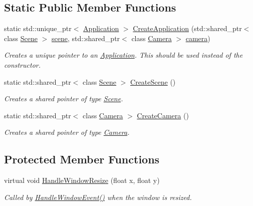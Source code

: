 \subsection*{Static Public Member Functions}
\begin{DoxyCompactItemize}
\item
static std\+::unique\+\_\+ptr$<$ \hyperlink{class_application}{Application} $>$ \hyperlink{class_application_a727f63f898a68bddf6d88309195ef194}{Create\+Application} (std\+::shared\+\_\+ptr$<$ class \hyperlink{class_scene}{Scene} $>$ \hyperlink{class_application_a88c6615107a5094bb93fa5f153f79554}{scene}, std\+::shared\+\_\+ptr$<$ class \hyperlink{class_camera}{Camera} $>$ \hyperlink{class_application_a0e8589fcb13c520ba472473abe5a518d}{camera})
\begin{DoxyCompactList}\small\item\em Creates a unique pointer to an \hyperlink{class_application}{Application}. This should be used instead of the constructor. \end{DoxyCompactList}\item
static std\+::shared\+\_\+ptr$<$ class \hyperlink{class_scene}{Scene} $>$ \hyperlink{class_application_a511e638cf5748e10151f17d6140b9119}{Create\+Scene} ()
\begin{DoxyCompactList}\small\item\em Creates a shared pointer of type \hyperlink{class_scene}{Scene}. \end{DoxyCompactList}\item
static std\+::shared\+\_\+ptr$<$ class \hyperlink{class_camera}{Camera} $>$ \hyperlink{class_application_a53c0a539fd2c4fe2cc48143cc0a3ea24}{Create\+Camera} ()
\begin{DoxyCompactList}\small\item\em Creates a shared pointer of type \hyperlink{class_camera}{Camera}. \end{DoxyCompactList}\end{DoxyCompactItemize}
\subsection*{Protected Member Functions}
\begin{DoxyCompactItemize}
\item
virtual void \hyperlink{class_application_abdba284a0f075ee1d4a2108c3a5236a2}{Handle\+Window\+Resize} (float x, float y)
\begin{DoxyCompactList}\small\item\em Called by \hyperlink{class_application_a74d92db64e051efa56d0357989dcb755}{Handle\+Window\+Event()} when the window is resized. \end{DoxyCompactList}\end{DoxyCompactItemize}
